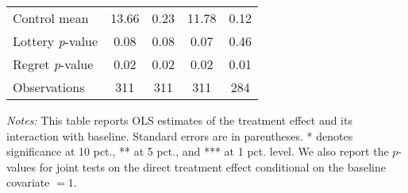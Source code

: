 \begin{table}[htbp]
{\begin{threeparttable}
\begin{tabular}{l*{4}{c}}
Control mean    &    13.66         &     0.23         &    11.78         &     0.12         \\
Lottery \emph{p}-value&     0.08         &     0.08         &     0.07         &     0.46         \\
Regret \emph{p}-value&     0.02         &     0.02         &     0.02         &     0.01         \\
Observations    &      311         &      311         &      311         &      284         \\
\bottomrule \end{tabular} \begin{tablenotes}[flushleft] \footnotesize \item \emph{Notes:} This table reports OLS estimates of the treatment effect and its interaction with baseline. Standard errors are in parentheses. * denotes significance at 10 pct., ** at 5 pct., and *** at 1 pct. level. We also report the \(p\)-values for joint tests on the direct treatment effect conditional on the baseline covariate $= 1$. \end{tablenotes} \end{threeparttable} } \end{table}


